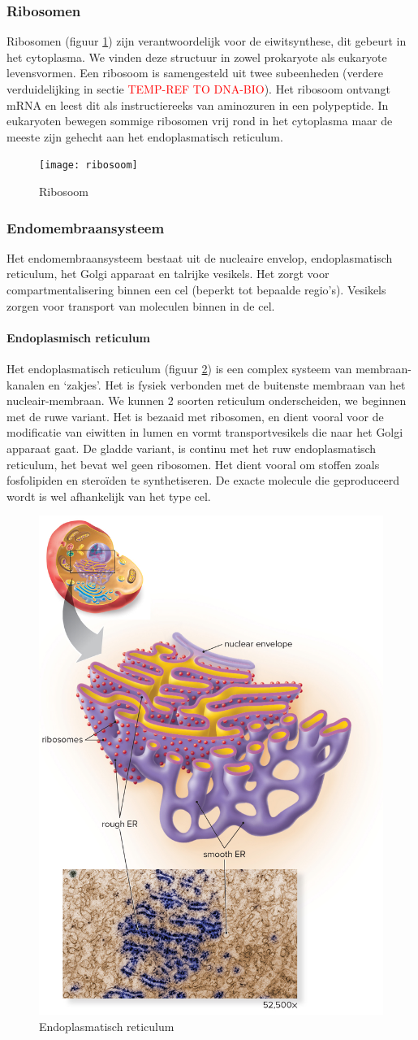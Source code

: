 \documentclass[a4paper,kul]{kulakarticle} %
\begin{document}
\subsubsection{Ribosomen}
Ribosomen (figuur \ref{fig:ribosoom}) zijn verantwoordelijk voor de eiwitsynthese, dit gebeurt in het cytoplasma. We vinden deze structuur in zowel prokaryote als eukaryote levensvormen. Een ribosoom is samengesteld uit twee subeenheden (verdere verduidelijking in sectie \textcolor{red}{TEMP-REF TO DNA-BIO}). Het ribosoom ontvangt mRNA en leest dit als instructiereeks van aminozuren in een polypeptide. In eukaryoten bewegen sommige ribosomen vrij rond in het cytoplasma maar de meeste zijn gehecht aan het endoplasmatisch reticulum. 
\begin{figure}[h]
	\centering
	\texttt{[image: ribosoom]}
	\caption[Ribosoom]{Ribosoom}
	\label{fig:ribosoom}
\end{figure}

\subsubsection{Endomembraansysteem}
Het endomembraansysteem bestaat uit de nucleaire envelop, endoplasmatisch reticulum, het Golgi apparaat en talrijke vesikels. Het zorgt voor compartmentalisering binnen een cel (beperkt tot bepaalde regio's). Vesikels zorgen voor transport van moleculen binnen in de cel.
\paragraph{Endoplasmisch reticulum}
Het endoplasmatisch reticulum (figuur \ref{fig:endoplasmatisch-reticulum}) is een complex systeem van membraan-kanalen en `zakjes'. Het is fysiek verbonden met de buitenste membraan van het nucleair-membraan. We kunnen 2 soorten reticulum onderscheiden, we beginnen met de ruwe variant. Het is bezaaid met ribosomen, en dient vooral voor de modificatie van eiwitten in lumen en vormt transportvesikels die naar het Golgi apparaat gaat. De gladde variant, is continu met het ruw endoplasmatisch reticulum, het bevat wel geen ribosomen.  Het dient vooral om stoffen zoals fosfolipiden en steroïden te synthetiseren. De exacte molecule die geproduceerd wordt is wel afhankelijk van het type cel.  
\begin{figure}[h]
	\centering
	\includegraphics[width=0.4\linewidth]{"Endoplasmatisch reticulum"}
	\caption[Endoplasmatisch reticulum]{Endoplasmatisch reticulum}
	\label{fig:endoplasmatisch-reticulum}
\end{figure}
\end{document}
